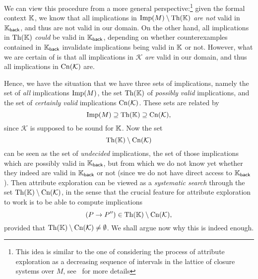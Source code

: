We can view this procedure from a more general perspective:\footnote{This idea is similar
  to the one of considering the process of attribute exploration as a decreasing sequence
  of intervals in the lattice of closure systems over $M$, see~\cite[pp.\
  143--145]{GORS-book} for more details} given the formal context ${\mathbb{K}}$, we know that
all implications in $\operatorname{Imp}(M) \setminus \operatorname{Th}({\mathbb{K}})$ \emph{are not} valid in ${\mathbb{K}}_{\mathsf{back}}$, and thus are not valid in our domain.  On the other hand, all
implications in $\operatorname{Th}({\mathbb{K}})$ \emph{could} be valid in ${\mathbb{K}}_{\mathsf{back}}$, depending
on whether counterexamples contained in ${\mathbb{K}}_{\mathsf{back}}$ invalidate implications
being valid in ${\mathbb{K}}$ or not.  However, what we are certain of is that all implications
in $\mathcal{K}$ \emph{are} valid in our domain, and thus all implications in
$\operatorname{Cn}(\mathcal{K})$ are.

Hence, we have the situation that we have three sets of implications, namely the set of
\emph{all} implications $\operatorname{Imp}(M)$, the set $\operatorname{Th}({\mathbb{K}})$ of \emph{possibly valid}
implications, and the set of \emph{certainly valid} implications $\operatorname{Cn}(\mathcal{K})$.
These sets are related by
\begin{equation*}
  \operatorname{Imp}(M) \supseteq \operatorname{Th}({\mathbb{K}}) \supseteq \operatorname{Cn}(\mathcal{K}),
\end{equation*}
since $\mathcal{K}$ is supposed to be sound for ${\mathbb{K}}$.  Now the set
\begin{equation*}
  \operatorname{Th}({\mathbb{K}}) \setminus \operatorname{Cn}(\mathcal{K})
\end{equation*}
can be seen as the set of \emph{undecided} implications, \ie the set of those implications
which are possibly valid in ${\mathbb{K}}_{\mathsf{back}}$, but from which we do not know yet
whether they indeed are valid in ${\mathbb{K}}_{\mathsf{back}}$ or not (since we do not have
direct access to ${\mathbb{K}}_{\mathsf{back}}$).  Then attribute exploration can be viewed as a
\emph{systematic search} through the set $\operatorname{Th}({\mathbb{K}}) \setminus \operatorname{Cn}(\mathcal{K})$, in the
sense that the crucial feature for attribute exploration to work is to be able to compute
implications
\begin{equation}
  \label{eq:33}
  (P \to P'') \in \operatorname{Th}({\mathbb{K}}) \setminus \operatorname{Cn}(\mathcal{K}),
\end{equation}
provided that $\operatorname{Th}({\mathbb{K}}) \setminus \operatorname{Cn}(\mathcal{K}) \neq \emptyset$.  We shall argue now
why this is indeed enough.

